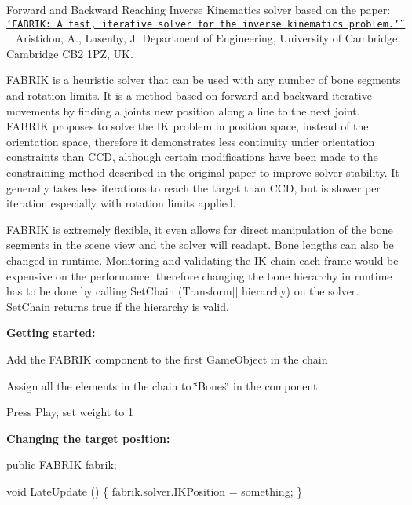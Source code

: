Forward and Backward Reaching Inverse Kinematics solver based on the paper\+: ~\newline
\href{http://andreasaristidou.com/publications/FABRIK.pdf}{\tt \char`\"{}\+F\+A\+B\+R\+I\+K\+: A fast, iterative solver for the inverse kinematics problem.\char`\"{} } ~\newline
Aristidou, A., Lasenby, J. Department of Engineering, University of Cambridge, Cambridge C\+B2 1\+PZ, UK.

F\+A\+B\+R\+IK is a heuristic solver that can be used with any number of bone segments and rotation limits. It is a method based on forward and backward iterative movements by finding a joint\textquotesingle{}s new position along a line to the next joint. F\+A\+B\+R\+IK proposes to solve the IK problem in position space, instead of the orientation space, therefore it demonstrates less continuity under orientation constraints than C\+CD, although certain modifications have been made to the constraining method described in the original paper to improve solver stability. It generally takes less iterations to reach the target than C\+CD, but is slower per iteration especially with rotation limits applied.

F\+A\+B\+R\+IK is extremely flexible, it even allows for direct manipulation of the bone segments in the scene view and the solver will readapt. Bone lengths can also be changed in runtime. Monitoring and validating the IK chain each frame would be expensive on the performance, therefore changing the bone hierarchy in runtime has to be done by calling Set\+Chain (Transform\mbox{[}\mbox{]} hierarchy) on the solver. Set\+Chain returns true if the hierarchy is valid.

{\bfseries Getting started\+:}
\begin{DoxyItemize}
\item Add the F\+A\+B\+R\+IK component to the first Game\+Object in the chain
\item Assign all the elements in the chain to \char`\"{}\+Bones\char`\"{} in the component
\item Press Play, set weight to 1
\end{DoxyItemize}

{\bfseries Changing the target position\+:}


\begin{DoxyCode}
\textcolor{keyword}{public} FABRIK fabrik;

\textcolor{keywordtype}{void} LateUpdate () \{
    fabrik.solver.IKPosition = something;
\}
\end{DoxyCode}


